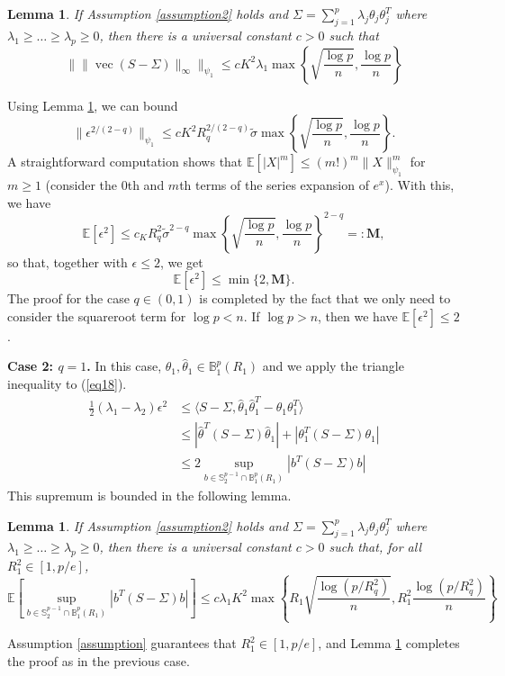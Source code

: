 \documentclass[11pt]{article}
\newtheorem{lemma}[theorem]{Lemma}
\newcommand{\E}{\mathbb{E}}
\newcommand{\B}{\mathbb{B}}
\begin{document}
\begin{lemma}\label{lemma322}
If Assumption \ref{assumption2} holds and $\Sigma = \sum_{j=1}^p\lambda_j\theta_j\theta_j^T$ where $\lambda_1\ge \dots \ge \lambda_p \ge 0$, then there is a universal constant $c>0$ such that
\begin{equation*}
\big\| \|\operatorname{vec}(S-\Sigma)\|_\infty\big\|_{\psi_1}\le cK^2\lambda_1\max\left\{\sqrt{\frac{\log p}{n}}, \frac{\log p}{n}\right\}
\end{equation*}
\end{lemma}
Using Lemma \ref{lemma322}, we can bound
\begin{equation*}
\|\epsilon^{2/(2-q)}\|_{\psi_1} \le cK^2 R_q^{2/(2-q)} \tilde\sigma \max\left\{\sqrt{\frac{\log p}{n}}, \frac{\log p}{n}\right\}.
\end{equation*}
A straightforward computation shows that $\E[|X|^m] \le (m!)^m\|X\|_{\psi_1}^m$ for $m\ge 1$ (consider the 0th and $m$th terms of the series expansion of $e^x$). With this, we have
\begin{equation*}
\E[\epsilon^2]\le c_KR_q^2\tilde\sigma^{2-q}\max\left\{\sqrt{\frac{\log p}{n}}, \frac{\log p}{n}\right\}^{2-q} =: \mathbf{M},
\end{equation*}
so that, together with $\epsilon\le 2$, we get
\begin{equation*}
\E[\epsilon^2]\le \min\{2, \mathbf{M}\}.
\end{equation*}
The proof for the case $q\in (0,1)$ is completed by the fact that we only need to consider the squareroot term for $\log p <n$. If $\log p> n$, then we have $\E[\epsilon^2]\le 2$.

\textbf{Case 2: $q=1$.} 
In this case, $\theta_1,\hat\theta_1\in\B^p_1(R_1)$ and we apply the triangle inequality to (\ref{eq18}).
\begin{align*}
\frac{1}{2}(\lambda_1 - \lambda_2)\epsilon^2 &\le \langle S-\Sigma, \hat\theta_1\hat\theta_1^T - \theta_1\theta_1^T\rangle \\
&\le |\hat\theta^T(S-\Sigma)\hat\theta_1| + |\theta_1^T(S-\Sigma)\theta_1| \\
&\le 2 \sup_{b\in \mathbb{S}^{p-1}_2\cap \B^p_1(R_1)} |b^T(S-\Sigma)b|
\end{align*}
This supremum is bounded in the following lemma.
\begin{lemma}\label{lemma323}
If Assumption \ref{assumption2} holds and $\Sigma = \sum_{j=1}^p\lambda_j\theta_j\theta_j^T$ where $\lambda_1\ge \dots \ge \lambda_p \ge 0$, then there is a universal constant $c>0$ such that, for all $R_1^2\in [1, p/e]$,
\begin{equation*}
\E\left[\sup_{b\in \mathbb{S}^{p-1}_2\cap \B^p_1(R_1)} |b^T(S-\Sigma)b|\right] \le c\lambda_1 K^2\max\left\{ R_1\sqrt{\frac{\log(p/R_q^2)}{n}}, R_1^2\frac{\log(p/R_q^2)}{n}\right\}
\end{equation*}
\end{lemma}
Assumption \ref{assumption} guarantees that $R_1^2\in [1, p/e]$, and Lemma \ref{lemma323} completes the proof as in the previous case. 
\end{document}
